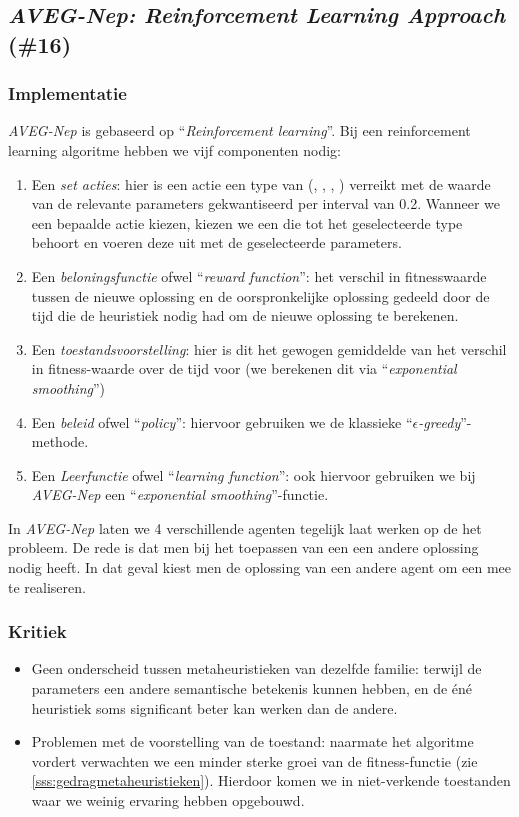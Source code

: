 \subsection{\emph{AVEG-Nep: Reinforcement Learning Approach} (\#16)}
\label{sss:aveg-nep}
\subsubsection{Implementatie}
\emph{AVEG-Nep}\cite{chesc-aveg-nep} is gebaseerd op ``\emph{Reinforcement learning}''\cite{rlaiacaml}. Bij een reinforcement learning algoritme hebben we vijf componenten nodig:
\begin{enumerate}
 \item Een \emph{set acties}: hier is een actie een type van \abllhn{} (\abmt{}, \abls{}, \abco{}, \abrr{}) verreikt met de waarde van de relevante parameters gekwantiseerd per interval van 0.2. Wanneer we een bepaalde actie kiezen, kiezen we een \abllh{} die tot het geselecteerde type behoort en voeren deze uit met de geselecteerde parameters.
 \item Een \emph{beloningsfunctie} ofwel ``\emph{reward function}'': het verschil in fitnesswaarde tussen de nieuwe oplossing en de oorspronkelijke oplossing gedeeld door de tijd die de heuristiek nodig had om de nieuwe oplossing te berekenen.
 \item Een \emph{toestandsvoorstelling}: hier is dit het gewogen gemiddelde van het verschil in fitness-waarde over de tijd voor (we berekenen dit via ``\emph{exponential smoothing}''\cite{Taylor2003a})
 \item Een \emph{beleid} ofwel ``\emph{policy}'': hiervoor gebruiken we de klassieke ``\emph{$\epsilon$-greedy}''-methode.
 \item Een \emph{Leerfunctie} ofwel ``\emph{learning function}'': ook hiervoor gebruiken we bij \emph{AVEG-Nep} een ``\emph{exponential smoothing}''-functie.
\end{enumerate}
In \emph{AVEG-Nep} laten we 4 verschillende agenten tegelijk laat werken op de het probleem. De rede is dat men bij het toepassen van een \abco{} \abh{} een andere oplossing nodig heeft. In dat geval kiest men de oplossing van een andere agent om een \abco{} mee te realiseren.
\subsubsection{Kritiek}
\begin{itemize}
 \item Geen onderscheid tussen metaheuristieken van dezelfde familie: terwijl de parameters een andere semantische betekenis kunnen hebben, en de \'en\'e heuristiek soms significant beter kan werken dan de andere.
 \item Problemen met de voorstelling van de toestand: naarmate het algoritme vordert verwachten we een minder sterke groei van de fitness-functie (zie \ref{sss:gedragmetaheuristieken}). Hierdoor komen we in niet-verkende toestanden waar we weinig ervaring hebben opgebouwd.
\end{itemize}
